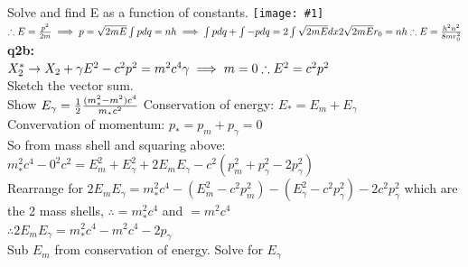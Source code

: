 \documentclass[10pt,landscape,a4paper]{article}
\newcommand{\half}{\frac{1}{2}}
\newcommand{\inlineimagesize}[2]{\texttt{[image: \#1]}\\}
\newcommand{\minititle}[1]{\textbf{#1:}\\}
\renewcommand{\^}[1]{\ensuremath{\hat{#1}}}
\renewcommand{\-}[1]{\text{\sout{\ensuremath{#1}}}}
\begin{document}
\begin{multicols}{3}
		Solve and find E as a function of constants. 
		\inlineimagesize{q2ai.png}{0.3}
		$ \therefore E = \frac{p^2}{2m} \implies p = \sqrt{2mE}\\
		\int p dq = nh \implies \int p dq + \int -p dq = 2\int \sqrt{2mE} dx\\
		2\sqrt{2mE}r_0 = nh \therefore E = \frac{h^2n^2}{8mr_0^2} $\\
		\minititle{q2b}
		$ X^*_2 \rightarrow X_2 + \gamma \\
		E^2 - c^2p^2 = m^2c^4 \\
		\gamma \implies m=0 \therefore E^2 = c^2p^2 $\\
		Sketch the vector sum.\\
		Show $ E_\gamma = \half\frac{(m_*^2-m^2)c^4}{m_*c^2}\\ $
		Conservation of energy: $ E_* = E_m + E_\gamma $\\
		Convervation of momentum: $ p_* = p_m+p_\gamma = 0 $\\
		So from mass shell and squaring above: $ m_*^2c^4-0^2c^2 =E_m^2+E_\gamma^2+2E_mE_\gamma-c^2(p_m^2+p_\gamma^2-2p_\gamma^2) $ \\
		Rearrange for $ 2E_mE_\gamma = m_*^2c^4 - (E_m^2-c^2p_m^2) - (E_\gamma^2-c^2p_\gamma^2) -2c^2p_\gamma^2 $ which are the 2 mass shells, $ \therefore = m_*^2c^4 $ and $ = m^2c^4 $\\
		$ \therefore 2E_mE_\gamma = m_*^2c^4 - m^2c^4-2p_\gamma $\\
		Sub $ E_m $ from conservation of energy. Solve for $ E_\gamma $\\
		
	\end{multicols}
\end{document}
